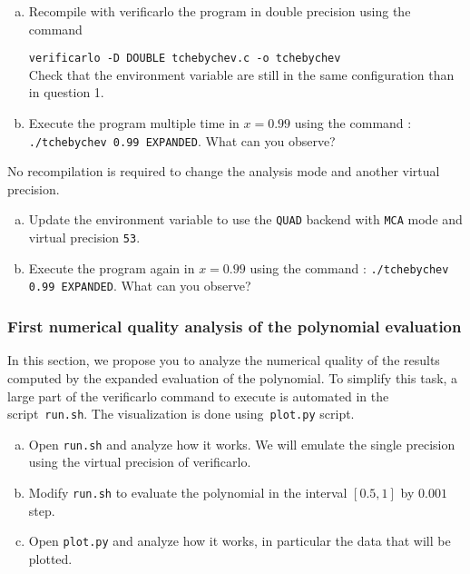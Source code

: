 \begin{question}
  \begin{enumerate}[(a)]
  \item Recompile with verificarlo the program in double precision using the command

    {\tt verificarlo -D DOUBLE tchebychev.c -o tchebychev} \\
   Check that the environment variable are still in the same configuration than in question 1.
  \item Execute the program multiple time in $x=0.99$ using the command : {\tt ./tchebychev 0.99 EXPANDED}. \newline
What can you observe?
  \end{enumerate}
\end{question}

No recompilation is required to change the analysis mode and another virtual precision.

\begin{question}
  \begin{enumerate}[(a)]
  \item Update the environment variable to use the {\tt QUAD} backend with  {\tt MCA} mode and virtual precision  {\tt 53}.
  \item Execute the program again in $x=0.99$ using the command : {\tt ./tchebychev 0.99 EXPANDED}. \newline
What can you observe?
  \end{enumerate}
\end{question}

\subsubsection{First numerical quality analysis of the polynomial evaluation}

In this section, we propose you to analyze the numerical quality of the results computed by the expanded evaluation of the polynomial. To simplify this task, a large part of the verificarlo command to execute is automated in the script~\texttt{run.sh}. The visualization is done using~\texttt{plot.py} script.






\begin{question}
  \begin{enumerate}[(a)]
 \item Open {\tt run.sh} and analyze how it works. We will emulate the single precision using the virtual precision of verificarlo.
  \item Modify {\tt run.sh} to evaluate the polynomial in the interval $[0.5,1]$ by $0.001$ step.
  \item Open {\tt plot.py} and analyze how it works, in particular the data that will be plotted.
  \end{enumerate}
\end{question}









